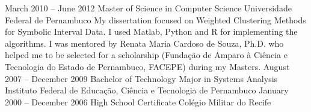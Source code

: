 \cvmetaevent
{March 2010 – June 2012}
{Master of Science in Computer Science}
{Universidade Federal de Pernambuco}
{My dissertation focused on Weighted Clustering Methods for Symbolic Interval Data. I  used Matlab, Python and R for implementing the algorithms. I was mentored by Renata Maria Cardoso de Souza, Ph.D.  who helped me to be selected for a scholarship (Fundação de Amparo à Ciência e Tecnologia do Estado de Pernambuco, FACEPE) during my Masters.}
\cvmetaevent
{August 2007 – December 2009}
{Bachelor of Technology Major in Systems Analysis}
{Instituto Federal de Educação, Ciência e Tecnologia de Pernambuco}
{}
\cvmetaevent
{January 2000 – December 2006}
{High School Certificate}
{Colégio Militar do Recife}
{}
